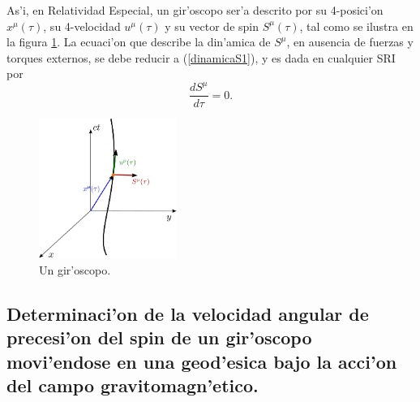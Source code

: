As'i, en Relatividad Especial, un gir'oscopo ser'a descrito por 
su 4-posici'on $x^{\mu}(\tau)$, su 4-velocidad $u^{\mu}(\tau)$ y su vector de spin $S^{\mu}(\tau)$, tal como se ilustra en la figura \ref{giroscopo}. La ecuaci'on que describe la din'amica de $S^{\mu}$, en ausencia de fuerzas y torques externos, se debe reducir a (\ref{dinamicaS1}), y es dada en cualquier SRI por
\begin{equation}\boxed{
\frac{dS^{\mu}}{d\tau}=0.}\label{dinamicaS2}
\end{equation}
\begin{figure}[H]
\centering
\includegraphics[angle=0,width=0.4\textwidth]{fig/fig-giroscopo.pdf}
\caption{Un gir'oscopo.}
\label{giroscopo}
\end{figure}

\subsection{Determinaci'on de la velocidad angular de precesi'on del spin de un gir'oscopo movi'endose en una geod'esica bajo la acci'on del campo gravitomagn'etico.}

